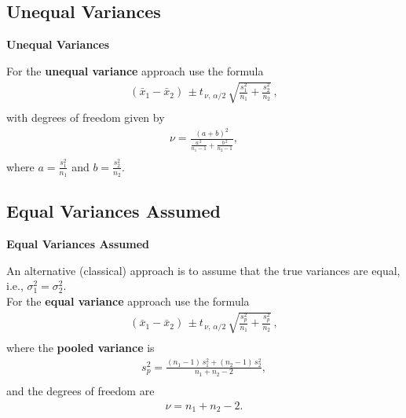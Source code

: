 \documentclass[compress]{beamer}        %
\makeatletter
\newcommand{\tcb}{\textcolor{beamer@blendedblue}}
\makeatother
\begin{document}
\subsection{Unequal Variances}
\begin{frame}{\bf \tcb{Unequal Variances}}

For the {\bf unequal variance} approach use the formula\\
\begin{align*}
\boxed{(\bar x_1 - \bar x_2) \, \pm t_{\,\nu,\,\alpha/2}\,\sqrt{\frac{s_1^2}{n_1}+\frac{s_2^2}{n_2}}\,},\\[-0.1cm]
\end{align*}
with degrees of freedom given by\\
\begin{align*}
\boxed{\nu = \frac{(a+b)^2}{\frac{a\,^2}{n_1-1}+\frac{b\,^2}{n_2-1}}},\\[-0.5cm]
\end{align*}
where $a = \frac{s_1^2}{n_1}$ and $b = \frac{s_2^2}{n_2}$.
\end{frame}


\subsection{Equal Variances Assumed}
\begin{frame}{\bf \tcb{Equal Variances Assumed}}

An alternative (classical) approach is to assume that the true variances are equal, i.e., $\sigma_1^2 = \sigma_2^2$.\\[0.4cm]

For the {\bf equal variance} approach use the formula
\begin{align*}
\boxed{(\bar x_1 - \bar x_2) \, \pm t_{\,\nu,\,\alpha/2}\,\sqrt{\frac{s_p^2}{n_1}+\frac{s_p^2}{n_2}}\,},\\[-0.3cm]
\end{align*}
where the {\bf pooled variance} is
\begin{align*}
\boxed{s_p^2 = \frac{(n_1-1)\,s_1^2+(n_2-1)\,s_2^2}{n_1+n_2-2}},\\[-0.3cm]
\end{align*}
and the degrees of freedom are
\begin{align*}
\boxed{\nu = n_1+n_2-2}.
\end{align*}

\end{frame}
\end{document}
